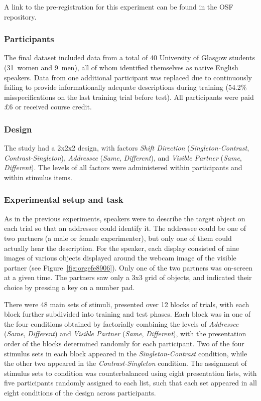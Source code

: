 \documentclass[natbib,man,a4paper]{apa6}
\begin{document}
A link to the pre-registration for this experiment can be found in the OSF repository.

\subsubsection*{Participants}
\label{sec:orgddb5ea9}

The final dataset included data from a total of 40 University of Glasgow students (31~women and 9~men), all of whom identified themselves as native English speakers. Data from one additional participant was replaced due to continuously failing to provide informationally adequate descriptions during training (54.2\% misspecifications on the last training trial before test). All participants were paid £6 or received course credit.

\subsubsection*{Design}
\label{sec:org322b945}

The study had a 2x2x2 design, with factors \emph{Shift Direction} (\emph{Singleton-Contrast}, \emph{Contrast-Singleton}), \emph{Addressee} (\emph{Same}, \emph{Different}), and \emph{Visible Partner} (\emph{Same}, \emph{Different}). The levels of all factors were administered within participants and within stimulus items.

\subsubsection*{Experimental setup and task}
\label{sec:orgdbbfd2c}

As in the previous experiments, speakers were to describe the target object on each trial so that an addressee could identify it. The addressee could be one of two partners (a male or female experimenter), but only one of them could actually hear the description. For the speaker, each display consisted of nine images of various objects displayed around the webcam image of the visible partner (see Figure~\ref{fig:orgefe8906}). Only one of the two partners was on-screen at a given time.  The partners saw only a 3x3 grid of objects, and indicated their choice by pressing a key on a number pad.

There were 48 main sets of stimuli, presented over 12 blocks of trials, with each block further subdivided into training and test phases. Each block was in one of the four conditions obtained by factorially combining the levels of \emph{Addressee} (\emph{Same}, \emph{Different}) and \emph{Visible Partner} (\emph{Same}, \emph{Different}), with the presentation order of the blocks determined randomly for each participant.  Two of the four stimulus sets in each block appeared in the \emph{Singleton-Contrast} condition, while the other two appeared in the \emph{Contrast-Singleton} condition.  The assignment of stimulus sets to condition was counterbalanced using eight presentation lists, with five participants randomly assigned to each list, such that each set appeared in all eight conditions of the design across participants.
\end{document}
